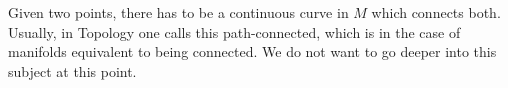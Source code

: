 \documentclass[
]{book}
\theoremstyle{definition}
\theoremstyle{definition}
\theoremstyle{definition}
\theoremstyle{definition}
\theoremstyle{remark}
\begin{document}
Given two points, there has to be a continuous curve in \(M\) which connects both. Usually, in Topology one calls this path-connected, which is in the case of manifolds equivalent to being connected. We do not want to go deeper into this subject at this point.

  
\end{document}
